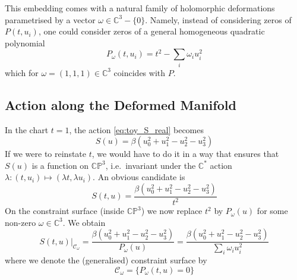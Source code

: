 \documentclass[a4paper,11pt]{article}
\newcommand{\CC}{\mathbb{C}}
\newcommand{\CP}{\mathbb{CP}}
\begin{document}
This embedding comes with a natural family of holomorphic deformations parametrised by a vector $\omega \in \CC^3 - \{ 0 \}$.
Namely, instead of considering zeros of $P(t,u_i)$, one could consider zeros of a general homogeneous quadratic polynomial 
\begin{equation}
  P_{\omega}(t,u_i) = t^2 - \sum_i \omega_i u_i^2
\end{equation}
which for $\omega = (1,1,1) \in \CC^3$ coincides with $P$.

\subsection{Action along the Deformed Manifold}
In the chart $t=1$, the action \eqref{eq:toy_S_real} becomes 
\begin{equation}
  S(u) = \beta \left( u_0^2 + u_1^2 - u_2^2 - u_3^2 \right)
\end{equation}
If we were to reinstate $t$, we would have to do it in a way that ensures that $S(u)$ is a function on $\CP^3$, i.e.\ invariant under the $\CC^*$ action $\lambda \colon (t,u_i) \mapsto (\lambda t, \lambda u_i)$.
An obvious candidate is 
\begin{equation}
  S(t,u) = \frac{\beta\left( u_0^2 + u_1^2 - u_2^2 - u_3^2 \right)}{t^2}
\end{equation}
On the constraint surface (inside $\CP^3$) we now replace $t^2$ by $P_{\omega}(u)$ for some non-zero $\omega \in \CC^3$.
We obtain 
\begin{equation}
  S(t,u)\rvert_{\mathcal C_{\omega}} = \frac{\beta\left( u_0^2 + u_1^2 - u_2^2 - u_3^2 \right)}{P_{\omega}(u)} = \frac{\beta\left( u_0^2 + u_1^2 - u_2^2 - u_3^2 \right)}{\sum_i \omega_i u_i^2}
\end{equation}
where we denote the (generalised) constraint surface by 
\begin{equation}
  \mathcal C_{\omega} = \{ P_{\omega}(t,u) = 0 \}
\end{equation}
\end{document}
